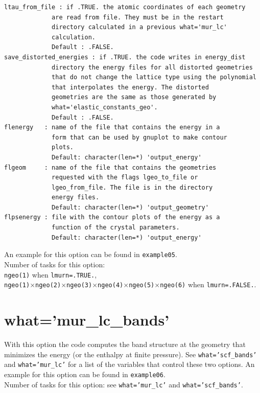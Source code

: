 \documentclass[12pt,a4paper,twoside]{report}
\begin{document}
\begin{verbatim}
ltau_from_file : if .TRUE. the atomic coordinates of each geometry
             are read from file. They must be in the restart
             directory calculated in a previous what='mur_lc' 
             calculation.
             Default : .FALSE.
save_distorted_energies : if .TRUE. the code writes in energy_dist 
             directory the energy files for all distorted geometries 
             that do not change the lattice type using the polynomial 
             that interpolates the energy. The distorted
             geometries are the same as those generated by
             what='elastic_constants_geo'.
             Default : .FALSE.
flenergy   : name of the file that contains the energy in a 
             form that can be used by gnuplot to make contour 
             plots.
             Default: character(len=*) 'output_energy'
flgeom     : name of the file that contains the geometries  
             requested with the flags lgeo_to_file or 
             lgeo_from_file. The file is in the directory 
             energy files.
             Default: character(len=*) 'output_geometry'
flpsenergy : file with the contour plots of the energy as a 
             function of the crystal parameters.
             Default: character(len=*) 'output_energy'
\end{verbatim}

An example for this option can be found in \texttt{example05}.\\
Number of tasks for this option: \\
\texttt{ngeo(1)} when \texttt{lmurn=.TRUE.}, \\
\texttt{ngeo(1)}$\times$\texttt{ngeo(2)}$\times$\texttt{ngeo(3)}$\times$\texttt{ngeo(4)}$\times$\texttt{ngeo(5)}$\times$\texttt{ngeo(6)} when 
\texttt{lmurn=.FALSE.}. 

\newpage
{\color{coral}\section{what='mur\_lc\_bands'}}
\color{black}
With this option the code computes the band structure at the geometry 
that minimizes the energy (or the enthalpy at finite pressure). See  
\texttt{what='scf\_bands'} and \texttt{what='mur\_lc'} for a list of 
the variables that control these two options. 
An example for this option can be found in \texttt{example06}. \\
Number of tasks for this option: see \texttt{what='mur\_lc'} and
\texttt{what='scf\_bands'}.
\end{document}
